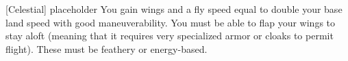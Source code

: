  {[Celestial]}
\shortfeat
{placeholder}
{You gain wings and a fly speed equal to double your base land speed with good maneuverability. You must be able to flap your wings to stay aloft (meaning that it requires very specialized armor or cloaks to permit flight). These must be feathery or energy-based.}